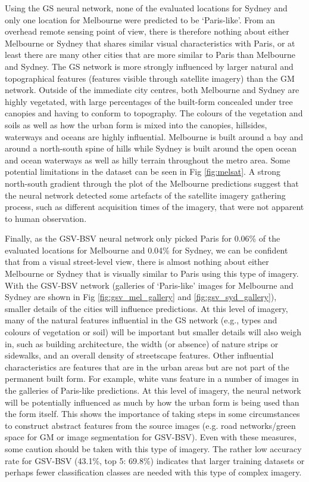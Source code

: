 \documentclass[10pt,letterpaper]{article}
\begin{document}
Using the GS neural network, none of the evaluated locations for Sydney and only one location for Melbourne were predicted to be `Paris-like'. From an overhead remote sensing point of view, there is therefore nothing about either Melbourne or Sydney that shares similar visual characteristics with Paris, or at least there are many other cities that are more similar to Paris than Melbourne and Sydney. The GS network is more strongly influenced by larger natural and topographical features (features visible through satellite imagery) than the GM network. Outside of the immediate city centres, both Melbourne and Sydney are highly vegetated, with large percentages of the built-form concealed under tree canopies and having to conform to topography. The colours of the vegetation and soils as well as how the urban form is mixed into the canopies, hillsides, waterways and oceans are highly influential. Melbourne is built around a bay and around a north-south spine of hills while Sydney is built around the open ocean and ocean waterways as well as hilly terrain throughout the metro area. Some potential limitations in the dataset can be seen in Fig \ref{fig:melsat}. A strong north-south gradient through the plot of the Melbourne predictions suggest that the neural network detected some artefacts of the satellite imagery gathering process, such as different acquisition times of the imagery, that were not apparent to human observation. 


Finally, as the GSV-BSV neural network only picked Paris for 0.06\% of the evaluated locations for Melbourne and 0.04\% for Sydney, we can be confident that from a visual street-level view, there is almost nothing about either Melbourne or Sydney that is visually similar to Paris using this type of imagery. With the GSV-BSV network (galleries of `Paris-like' images for Melbourne and Sydney are shown in Fig \ref{fig:gsv_mel_gallery} and  \ref{fig:gsv_syd_gallery}), smaller details of the cities will influence predictions. At this level of imagery, many of the natural features influential in the GS network (e.g., types and colours of vegetation or soil) will be important but smaller details will also weigh in, such as building architecture, the width (or absence) of nature strips or sidewalks, and an overall density of streetscape features. Other influential characteristics are features that are in the urban areas but are not part of the permanent built form. For example, white vans feature in a number of images in the galleries of Paris-like predictions. At this level of imagery, the neural network will be potentially influenced as much by how the urban form is being used than the form itself. This shows the importance of taking steps in some circumstances to construct abstract features from the source images (e.g. road networks/green space for GM or image segmentation for GSV-BSV). Even with these measures, some caution should be taken with this type of imagery. The rather low accuracy rate for GSV-BSV (43.1\%, top 5: 69.8\%) indicates that larger training datasets or perhaps fewer classification classes are needed with this type of complex imagery.
\end{document}
